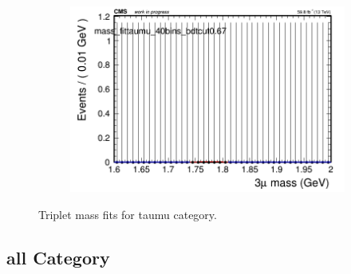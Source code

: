 \begin{figure}[H]
\begin{subfigure}{0.2\textwidth}
        \includegraphics[width=\textwidth]{unfixed_exp/plots/taumu/massfit_taumu_40bins_bdtcut0.67.png}
        \caption{}
    \end{subfigure}
    \caption{Triplet mass fits for taumu category.}
    \label{fig:unfixedexptaumu}
\end{figure}

\subsection{all Category}
\label{sec:unfixedexpall}

